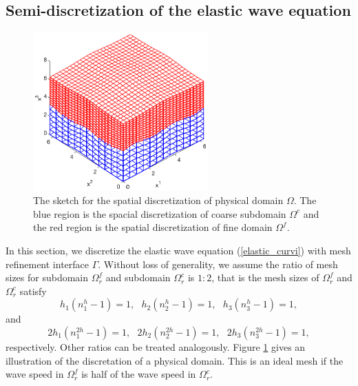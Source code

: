 \subsection{Semi-discretization of the elastic wave equation}\label{semi_discrete_form}

\begin{figure}[htbp]
	\centering
	\includegraphics[width=0.6\textwidth,trim={0.4cm 0.7cm 0.8cm 1.4cm}, clip]{physical_discretization.eps}
	\caption{The sketch for the spatial discretization of physical domain $\Omega$. The blue region is the spacial discretization of coarse subdomain $\Omega^c$ and the red region is the spatial discretization of fine domain $\Omega^f$.}\label{physical_discretization}
\end{figure}

In this section, we discretize the elastic wave equation (\ref{elastic_curvi}) with mesh refinement interface $\Gamma$. Without loss of generality, we assume the ratio of mesh sizes for subdomain $\Omega^f_r$ and subdomain $\Omega^c_r$ is $1:2$, that is the mesh sizes of $\Omega_r^f$ and $\Omega_r^c$ satisfy
\[h_1(n_1^h-1) = 1, \ \ \ h_2(n_2^h-1) = 1, \ \ \ h_3(n_3^h-1) = 1,\]
and
\[2h_1(n_1^{2h}-1) = 1, \ \ \ 2h_2(n_2^{2h}-1) = 1, \ \ \ 2h_3(n_3^{2h}-1) = 1,\]
respectively. Other ratios can be treated analogously. Figure \ref{physical_discretization} gives an illustration of the discretation of a physical domain. This is an ideal mesh if the wave speed in $\Omega_r^f$ is half of the wave speed in $\Omega_r^c$.

